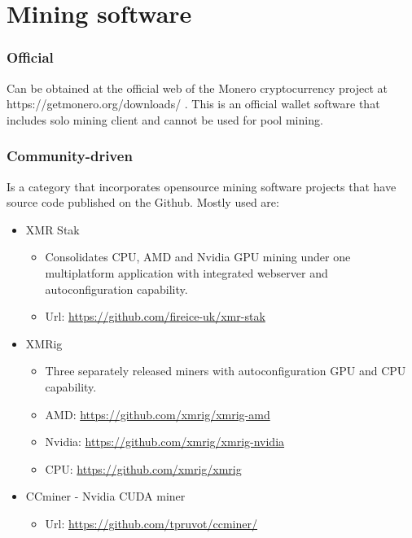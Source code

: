 \documentclass[
  printed, %
  table,   %
  nolof,     %
  nolot,     %
           oneside, color
]{fithesis3}
\begin{document}
\section{Mining software}
\subsubsection{Official}
Can be obtained at the official web of the Monero cryptocurrency project at https://getmonero.org/downloads/ . This is an official wallet software that includes solo mining client and cannot be used for pool mining.

\subsubsection{Community-driven}
Is a category that incorporates opensource mining software projects that have source code published on the Github. Mostly used are:

\begin{itemize}\itemsep0em
\item XMR Stak 
\begin{itemize}\itemsep0em \item Consolidates CPU, AMD and Nvidia GPU mining under one multiplatform application with integrated webserver and autoconfiguration capability. \item Url: \url{https://github.com/fireice-uk/xmr-stak} \end{itemize}
\setlength\itemsep{1em}
\item XMRig 
\setlength\itemsep{0em}
\begin{itemize}\itemsep0em \item Three separately released miners with autoconfiguration GPU and CPU capability. \item AMD: \url{https://github.com/xmrig/xmrig-amd} 
 \item Nvidia: \url{https://github.com/xmrig/xmrig-nvidia} \item CPU: \url{https://github.com/xmrig/xmrig} \end{itemize}
\item CCminer - Nvidia CUDA miner
\begin{itemize}\itemsep0em \item Url: \url{https://github.com/tpruvot/ccminer/} \end{itemize}
\end{itemize}
\end{document}
